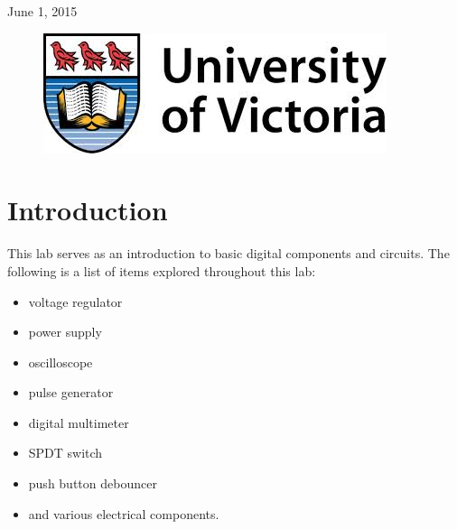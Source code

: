 \documentclass[11pt]{article}
\begin{document}
\begin{titlepage}
{\large June 1, 2015}\\ %

\begin{figure}[b]	 %
	\centering
	\includegraphics[scale=0.3]{UVic_logo}
\end{figure}

\end{titlepage}


\section{Introduction}

This lab serves as an introduction to basic digital components and circuits. The following is a list of items explored throughout this lab:

\begin{itemize}

	 \item voltage regulator 
 	 \item power supply
	 \item oscilloscope
	 \item pulse generator
	 \item digital multimeter
	 \item SPDT switch
	 \item push button debouncer
	 \item and various electrical components.
	  
\end{itemize}
\end{document}
